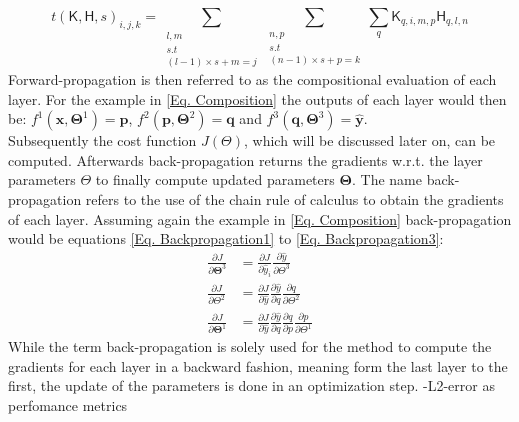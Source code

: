 \begin{equation}\label{Eq: Transposed convolution}
	t(\mathsf{K},\mathsf{H},s)_{i,j,k} = \sum_{\substack{l,m\\s.t\\(l-1)\times s+m=j}}
												  \sum_{\substack{n,p\\s.t\\(n-1)\times s+p=k}}
												  \sum_q \mathsf{K}_{q,i,m,p}\mathsf{H}_{q,l,n} 
\end{equation}
\noindent
Forward-propagation is then referred to as the compositional evaluation of each layer. For the example in \cref{Eq. Composition} the outputs of each layer would then be:  \(f^1(\mathbf{x},\mathbf{\Theta}^1) = \mathbf{p}\), \(f^2(\mathbf{p},\mathbf{\Theta}^2) = \mathbf{q}\) and \(f^3(\mathbf{q},\mathbf{\Theta}^3) = \mathbf{\hat{y}}\).\\
Subsequently the cost function \(J(\Theta)\), which will be discussed later on, can be computed. Afterwards back-propagation returns the gradients w.r.t. the layer parameters \(\Theta\) to finally compute updated parameters \(\mathbf{\Theta}\).  The name back-propagation refers to the use of the chain rule of calculus to obtain the gradients of each layer. Assuming again the example in \cref{Eq. Composition} back-propagation would be equations \cref{Eq. Backpropagation1} to \cref{Eq. Backpropagation3}:
\begin{align}
	\frac{\partial J}{\partial \mathbf{\Theta}^3} &= \frac{\partial J}{\partial\hat{y}_i}\frac{\partial\hat{y}}{\partial \Theta^3}
\label{Eq. Backpropagation3}\\
	\frac{\partial J}{\partial \Theta^2} &= \frac{\partial J}{\partial\hat{y}}\frac{\partial\hat{y}}{\partial q}\frac{\partial q}{\partial \Theta^2}
\label{Eq. Backpropagation2}\\
	\frac{\partial J}{\partial \mathbf{\Theta}^1} &= \frac{\partial J}{\partial\hat{y}}\frac{\partial\hat{y}}{\partial q}\frac{\partial q}{\partial p}\frac{\partial p}{\partial \Theta^1}
\label{Eq. Backpropagation1}
\end{align}
While the term back-propagation is solely used for the method to compute the gradients for each layer in a backward fashion, meaning form the last layer to the first, the update of the parameters is done in an optimization step.
-L2-error as perfomance metrics
